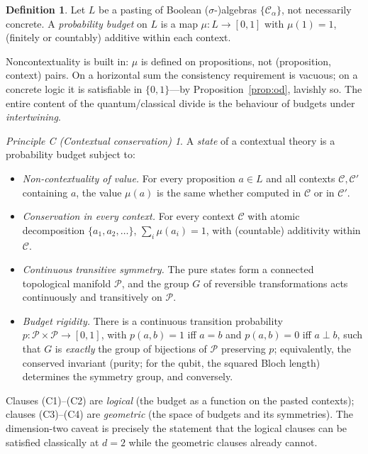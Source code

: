 \documentclass[11pt]{article}
\theoremstyle{definition}
\newtheorem{definition}[theorem]{Definition}
\theoremstyle{remark}
\newtheorem*{principleC}{Principle C (Contextual conservation)}
\newcommand{\C}{\mathcal{C}}
\begin{document}
\begin{definition}\label{def:budget}
Let $L$ be a pasting of Boolean ($\sigma$-)algebras $\{\C_\alpha\}$, not
necessarily concrete. A \emph{probability budget} on $L$ is a map
$\mu\colon L\to[0,1]$ with $\mu(1)=1$, (finitely or countably) additive
within each context.
\end{definition}

Noncontextuality is built in: $\mu$ is defined on propositions, not
(proposition, context) pairs. On a horizontal sum the consistency
requirement is vacuous; on a concrete logic it is satisfiable in
$\{0,1\}$---by Proposition~\ref{prop:od}, lavishly so. The entire
content of the quantum/classical divide is the behaviour of budgets
under \emph{intertwining}.

\begin{principleC}
A \emph{state} of a contextual theory is a probability budget subject to:
\begin{itemize}
\item[\textbf{(C1)}] \emph{Non-contextuality of value.} For every
proposition $a\in L$ and all contexts $\C,\C'$ containing $a$, the value
$\mu(a)$ is the same whether computed in $\C$ or in $\C'$.
\item[\textbf{(C2)}] \emph{Conservation in every context.} For every
context $\C$ with atomic decomposition $\{a_{1},a_{2},\dots\}$,
$\sum_{i}\mu(a_{i})=1$, with (countable) additivity within $\C$.
\item[\textbf{(C3)}] \emph{Continuous transitive symmetry.} The pure
states form a connected topological manifold $\mathcal{P}$, and the
group $G$ of reversible transformations acts continuously and
transitively on $\mathcal{P}$.
\item[\textbf{(C4)}] \emph{Budget rigidity.} There is a continuous
transition probability $p\colon\mathcal{P}\times\mathcal{P}\to[0,1]$,
with $p(a,b)=1$ iff $a=b$ and $p(a,b)=0$ iff $a\perp b$, such that $G$
is \emph{exactly} the group of bijections of $\mathcal{P}$ preserving
$p$; equivalently, the conserved invariant (purity; for the qubit, the
squared Bloch length) determines the symmetry group, and conversely.
\end{itemize}
\end{principleC}

Clauses (C1)--(C2) are \emph{logical} (the budget as a function on the
pasted contexts); clauses (C3)--(C4) are \emph{geometric} (the space of
budgets and its symmetries). The dimension-two caveat is precisely the
statement that the logical clauses can be satisfied classically at
$d=2$ while the geometric clauses already cannot.
\end{document}
